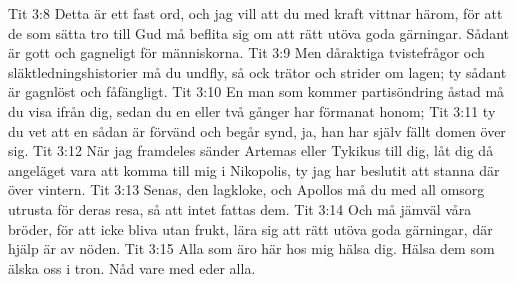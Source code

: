 Tit 3:8  Detta är ett fast ord, och jag vill att du med kraft vittnar härom, för att de som sätta tro till Gud må beflita sig om att rätt utöva goda gärningar. Sådant är gott och gagneligt för människorna.
Tit 3:9  Men dåraktiga tvistefrågor och släktledningshistorier må du undfly, så ock trätor och strider om lagen; ty sådant är gagnlöst och fåfängligt.
Tit 3:10  En man som kommer partisöndring åstad må du visa ifrån dig, sedan du en eller två gånger har förmanat honom;
Tit 3:11  ty du vet att en sådan är förvänd och begår synd, ja, han har själv fällt domen över sig.
Tit 3:12  När jag framdeles sänder Artemas eller Tykikus till dig, låt dig då angeläget vara att komma till mig i Nikopolis, ty jag har beslutit att stanna där över vintern.
Tit 3:13  Senas, den lagkloke, och Apollos må du med all omsorg utrusta för deras resa, så att intet fattas dem.
Tit 3:14  Och må jämväl våra bröder, för att icke bliva utan frukt, lära sig att rätt utöva goda gärningar, där hjälp är av nöden.
Tit 3:15  Alla som äro här hos mig hälsa dig. Hälsa dem som älska oss i tron. Nåd vare med eder alla.



